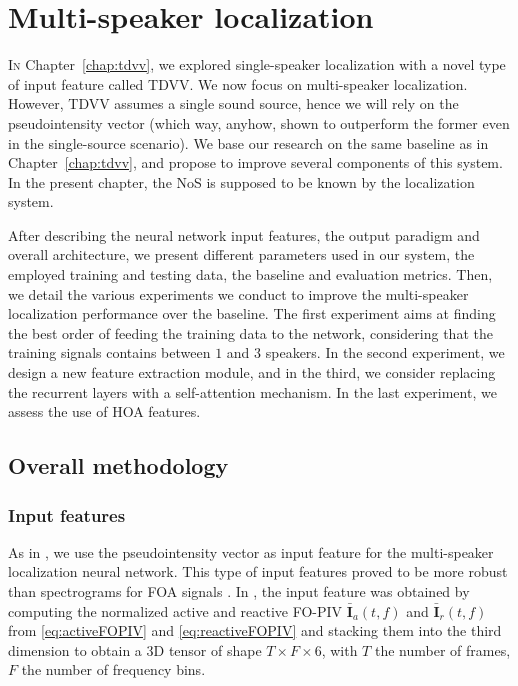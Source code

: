
\chapter{Multi-speaker localization}
\label{chap:multisourceLocalization}

\lettrine{I}{n} Chapter~\ref{chap:tdvv}, we explored single-speaker localization with a novel type of input feature called TDVV. We now focus on multi-speaker localization. However, TDVV assumes a single sound source, hence we will rely on the pseudointensity vector (which way, anyhow, shown to outperform the former even in the single-source scenario). We base our research on the same baseline \cite{perotin_crnn-based_2019} as in Chapter~\ref{chap:tdvv}, and propose to improve several components of this system. In the present chapter, the NoS is supposed to be known by the localization system.

After describing the neural network input features, the output paradigm and overall architecture, we present different parameters used in our system, the employed training and testing data, the baseline and evaluation metrics. Then, we detail the various experiments we conduct to improve the multi-speaker localization performance over the baseline. The first experiment aims at finding the best order of feeding the training data to the network, considering that the training signals contains between $1$ and $3$ speakers. In the second experiment, we design a new feature extraction module, and in the third, we consider replacing the recurrent layers with a self-attention mechanism. In the last experiment, we assess the use of HOA features.

\section{Overall methodology}
\subsection{Input features}

As in \cite{perotin_crnn-based_2019}, we use the pseudointensity vector as input feature for the multi-speaker localization neural network. This type of input features proved to be more robust than spectrograms for FOA signals \cite{perotin_crnn-based_2018}. In \cite{perotin_crnn-based_2019}, the input feature was obtained by computing the normalized active and reactive FO-PIV $\bar{\mathbf{I}}_a(t,f)$ and $\bar{\mathbf{I}}_r(t,f)$ from \eqref{eq:activeFOPIV} and \eqref{eq:reactiveFOPIV} and stacking them into the third dimension to obtain a 3D tensor of shape $T \times F \times 6$, with $T$ the number of frames, $F$ the number of frequency bins.


